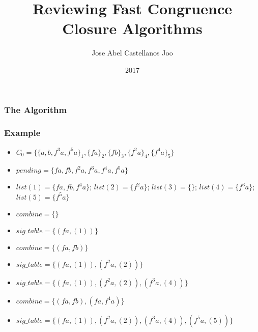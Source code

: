 \documentclass{beamer}
\title{Reviewing Fast Congruence Closure Algorithms}
\author{Jose Abel Castellanos Joo}
\institute{University of New Mexico}
\date{2017}
\begin{document}
\frame{\titlepage}

\begin{frame}
  \frametitle{The Algorithm}
\end{frame}

\begin{frame}
  \frametitle{Example}
  \begin{itemize}
  \item $C_0 = \{ \{a, b, f^3 a, f^5 a\}_1 ,\{f a\}_2 ,\{f b\}_3 ,\{f^2 a\}_4 ,\{f^4 a\}_5\}$
  \item $pending = \{f a, f b, f^2 a, f^3 a, f^4 a, f^5 a\}$
  \item $list(1) = \{f a, f b, f^4 a\}$; $list(2) = \{f^2 a\}$; $list(3) = \{\}$; $list(4) = \{f^3 a\}$; $list(5) = \{f^ 5 a\}$
  \item $combine = \{\}$
  \item $sig\_table = \{(f a, (1))\}$
  \item $combine = \{(f a, f b)\}$
  \item $sig\_table = \{(f a , (1)), (f^2 a , (2) )\}$
  \item $sig\_table = \{(f a , (1)), (f^2 a , (2) ), (f^3 a, (4))\}$
  \item $combine = \{(fa, fb), (fa, f^4 a)\}$
  \item $sig\_table = \{(f a , (1)), (f^2 a , (2) ), (f^3 a, (4)), (f^5 a, (5))\}$
  \end{itemize}
\end{frame}
\end{document}
